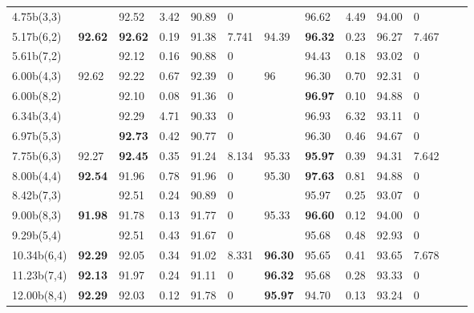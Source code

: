 \documentclass{article}
\theoremstyle{definition}
\theoremstyle{remark}
\begin{document}
\begin{table}[]
\begin{tabular}{|p{1.1cm}| 
    p{0.6cm}| p{0.6cm}| p{0.6cm} |
    p{0.6cm} |p{0.6cm}| p{0.6cm}| 
    p{0.6cm}| p{0.6cm} |p{0.6cm} |
    p{0.6cm}|p{0.6cm}|p{0.6cm}|}
4.75b(3,3)   &                        & 92.52 &	3.42  & 90.89  &	0      &                        & 96.62 &	4.49	 & 94.00 & 0 \\  \cline{2-2} \cline{7-7}
5.17b(6,2)   & \multirow{2}{*}{\textbf{92.62}} & \textbf{92.62} &	0.19  & 91.38  &	7.741  & \multirow{2}{*}{94.39} & \textbf{96.32} &	0.23	 & 96.27 & 7.467 \\
5.61b(7,2)   &                        & 92.12 &	0.16  & 90.88  &	0      &                        & 94.43 &	0.18	 & 93.02 & 0 \\ \cline{2-2} \cline{7-7}
6.00b(4,3)   & \multirow{4}{*}{92.62} & 92.22 &	0.67  & 92.39  &	0      & \multirow{4}{*}{96}    & 96.30 &	0.70	 & 92.31 & 0 \\
6.00b(8,2)   &                        & 92.10 &	0.08  & 91.36  &	0      &                        & \textbf{96.97} &	0.10	 & 94.88 & 0 \\ 
6.34b(3,4)   &                        & 92.29 &	4.71  & 90.33  &	0      &                        & 96.93 &	6.32	 & 93.11 & 0 \\
6.97b(5,3)   &                        & \textbf{92.73} &	0.42  & 90.77  &	0      &                        & 96.30 &	0.46	 & 94.67 & 0 \\ \cline{2-2} \cline{7-7}
7.75b(6,3)   & 92.27                  & \textbf{92.45} &	0.35  & 91.24  &	8.134  & 95.33                  & \textbf{95.97} &	0.39	 & 94.31 & 7.642 \\ \cline{2-2} \cline{7-7}
8.00b(4,4)   & \multirow{2}{*}{\textbf{92.54}} & 91.96 &	0.78  & 91.96  &	0      & \multirow{2}{*}{95.30} & \textbf{97.63} &	0.81	 & 94.88 & 0 \\
8.42b(7,3)   &                        & 92.51 &	0.24  & 90.89  &	0      &                        & 95.97 &	0.25	 & 93.07 & 0 \\ \cline{2-2} \cline{7-7}
9.00b(8,3)   & \multirow{2}{*}{\textbf{91.98}} & 91.78 &	0.13  & 91.77  &	0      & \multirow{2}{*}{95.33} & \textbf{96.60} &	0.12	 & 94.00 & 0 \\
\textbf{}9.29b(5,4)   &                        & 92.51 &	0.43  & 91.67  &	0      &                        & 95.68 &	0.48	 & 92.93 & 0 \\ \cline{2-2} \cline{7-7}
10.34b(6,4)  & \textbf{92.29}                  & 92.05 &	0.34  & 91.02  &	8.331  & \textbf{96.30}                  & 95.65 &	0.41	 & 93.65 & 7.678 \\ \cline{2-2} \cline{7-7}
11.23b(7,4)  & \textbf{92.13}                  & 91.97 &	0.24  & 91.11  &	0      & \textbf{96.32}                  & 95.68 &	0.28	 & 93.33 & 0 \\ \cline{2-2} \cline{7-7}
12.00b(8,4)  & \textbf{92.29}                  & 92.03 &	0.12  & 91.78  &	0      & \textbf{95.97}                  & 94.70 &	0.13	 & 93.24 & 0 \\ \hline

\end{tabular}
\end{table}
\end{document}
